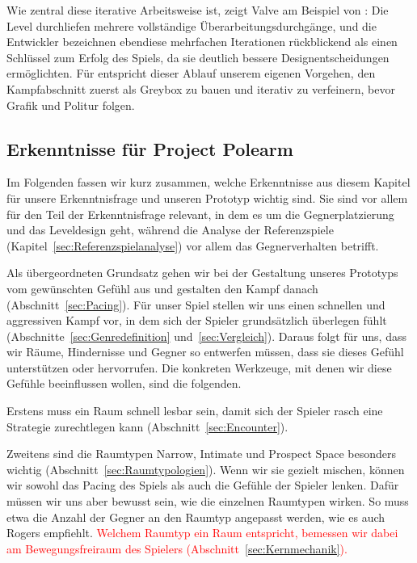 \documentclass[../Main.tex]{subfiles}
\begin{document}
Wie zentral diese iterative Arbeitsweise ist, zeigt Valve am Beispiel von \autocite{valve_halflife2_2004}: Die Level durchliefen mehrere vollständige Überarbeitungsdurchgänge, und die Entwickler bezeichnen ebendiese mehrfachen Iterationen rückblickend als einen Schlüssel zum Erfolg des Spiels, da sie deutlich bessere Designentscheidungen ermöglichten.\autocite{jacobson2005postmortem} Für  entspricht dieser Ablauf unserem eigenen Vorgehen, den Kampfabschnitt zuerst als Greybox zu bauen und iterativ zu verfeinern, bevor Grafik und Politur folgen.

\subsection{Erkenntnisse für Project Polearm} \label{sec:ZwischenfazitLD}

Im Folgenden fassen wir kurz zusammen, welche Erkenntnisse aus diesem Kapitel für unsere Erkenntnisfrage und unseren Prototyp wichtig sind. Sie sind vor allem für den Teil der Erkenntnisfrage relevant, in dem es um die Gegnerplatzierung und das Leveldesign geht, während die Analyse der Referenzspiele (Kapitel~\ref{sec:Referenzspielanalyse}) vor allem das Gegnerverhalten betrifft.

Als übergeordneten Grundsatz gehen wir bei der Gestaltung unseres Prototyps vom gewünschten Gefühl aus und gestalten den Kampf danach (Abschnitt~\ref{sec:Pacing}). Für unser Spiel stellen wir uns einen schnellen und aggressiven Kampf vor, in dem sich der Spieler grundsätzlich überlegen fühlt (Abschnitte~\ref{sec:Genredefinition} und~\ref{sec:Vergleich}). Daraus folgt für uns, dass wir Räume, Hindernisse und Gegner so entwerfen müssen, dass sie dieses Gefühl unterstützen oder hervorrufen. Die konkreten Werkzeuge, mit denen wir diese Gefühle beeinflussen wollen, sind die folgenden.

Erstens muss ein Raum schnell lesbar sein, damit sich der Spieler rasch eine Strategie zurechtlegen kann (Abschnitt~\ref{sec:Encounter}).

Zweitens sind die Raumtypen Narrow, Intimate und Prospect Space besonders wichtig (Abschnitt~\ref{sec:Raumtypologien}). Wenn wir sie gezielt mischen, können wir sowohl das Pacing des Spiels als auch die Gefühle der Spieler lenken. Dafür müssen wir uns aber bewusst sein, wie die einzelnen Raumtypen wirken. So muss etwa die Anzahl der Gegner an den Raumtyp angepasst werden, wie es auch Rogers empfiehlt.\autocite[245]{rogers2014levelup} \textcolor{red}{Welchem Raumtyp ein Raum entspricht, bemessen wir dabei am Bewegungsfreiraum des Spielers (Abschnitt~\ref{sec:Kernmechanik}).}
\end{document}

